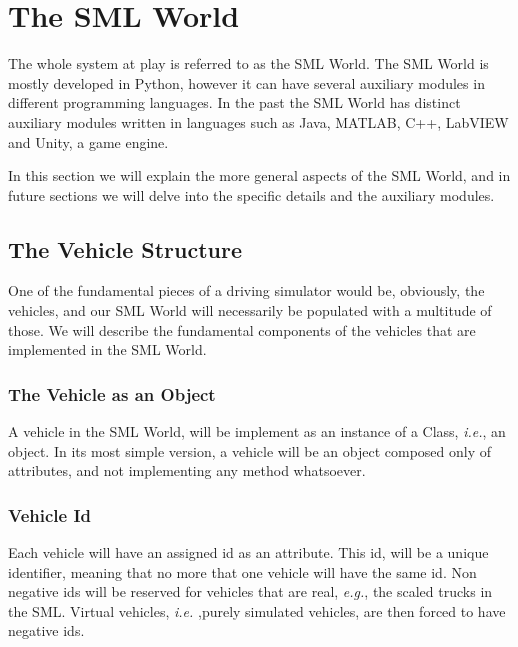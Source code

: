 
\graphicspath{ {SectionTheSMLWorld/Images/} }

\section{The SML World}
\label{sec:the_sml_world}

The whole system at play is referred to as the SML World. The SML World is mostly developed in Python, however it can have several auxiliary modules in different programming languages. In the past the SML World has distinct auxiliary modules written in languages such as Java, MATLAB, C++, LabVIEW and Unity, a game engine.

In this section we will explain the more general aspects of the SML World, and in future sections we will delve into the specific details and the auxiliary modules.

\subsection{The Vehicle Structure}
\label{subsec:the_vehicle_structure}

One of the fundamental pieces of a driving simulator would be, obviously, the vehicles, and our SML World will necessarily be populated with a multitude of those. We will describe the fundamental components of the vehicles that are implemented in the SML World.

\subsubsection{The Vehicle as an Object}

A vehicle in the SML World, will be implement as an instance of a Class, \textit{i.e.}, an object. In its most simple version, a vehicle will be an object composed only of attributes, and not implementing any method whatsoever.

\subsubsection{Vehicle Id}

Each vehicle will have an assigned id as an attribute. This id, will be a unique identifier, meaning that no more that one vehicle will have the same id. Non negative ids will be reserved for vehicles that are real, \textit{e.g.}, the scaled trucks in the SML. Virtual vehicles, \textit{i.e.} ,purely simulated vehicles, are then forced to have negative ids.

